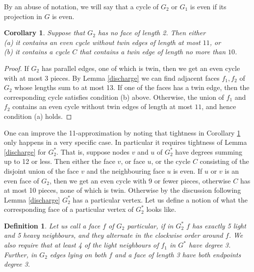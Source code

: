 \documentclass{article}
\newcommand{\0}{\mathbb{0}}
\newcommand{\1}{\mathbb{1}}
\newtheorem{definition}[theorem]{Definition}
\newtheorem{corollary}[theorem]{Corollary}
\begin{document}
By an abuse of notation, we will say that a cycle of $G_2$ or $G_1$ is even if its projection in $G$ is even.
\begin{corollary}\label{cor:smallec improved}
Suppose that $G_2$ has no face of length 2. Then either \\ (a) it contains an even cycle without twin edges of length at most $11$, or \\ (b) it contains a cycle $C$ that contains a twin edge of length no more than $10$. 
\end{corollary}
\begin{proof} 
If $G_2$ has parallel edges, one of which is twin, then we get an even cycle with at most 3 pieces.
By Lemma \ref{discharge} we can find adjacent faces $f_1,f_2$ of $G_2$ whose lengths sum
to at most 13. If one of the faces has a twin edge, then the corresponding cycle satisfies
condition (b) above. Otherwise, the union of $f_1$ and $f_2$ contains an even cycle
without twin edges of length at most $11$, and hence condition (a) holds. 
\end{proof}
One can improve the 11-approximation by noting that tightness in Corollary \ref{cor:smallec improved} only happens in a very specific case. In particular it requires tightness of Lemma \ref{discharge} for $G_2^*$. That is, suppose nodes $v$ and $u$ of $G_2^*$ have degrees summing up to 12 or less. Then either the face $v$, or  face $u$, or the  cycle $C$ consisting of the disjoint union of the face $v$ and the neighbouring face $u$ is even.  If $u$ or $v$ is an even face of $G_2$, then we get an even cycle with 9 or fewer pieces, otherwise $C$ has at most 10 pieces, none of which is twin.  
Otherwise by the discussion following Lemma \ref{discharge} $G_2^*$ has a particular vertex.  Let us define a notion of what the corresponding face of a particular vertex of $G_2^*$ looks like.
\begin{definition}
Let us call a face $f$ of $G_2$ \emph{particular}, if in $G_2^*$ $f$ has exactly 5 light and 5 heavy neighbours, and they alternate in the clockwise order around $f$. We  also require that at least 4 of the light neighbours of $f_1$ in $G^*$ have degree 3. Further, in $G_2$ edges lying on both $f$ and a  face of length 3 have both endpoints degree 3.
\end{definition}
\end{document}

